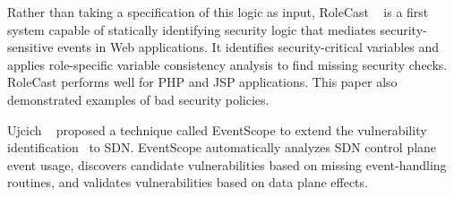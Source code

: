 Rather than taking a specification of this logic as input, RoleCast
\etal~\cite{10.1145/2048066.2048146} is a first system capable of statically
identifying security logic that mediates security-sensitive events in Web
applications. It identifies security-critical variables and applies
role-specific variable consistency analysis to find missing security checks.
RoleCast performs well for PHP and JSP applications. This paper also
demonstrated examples of bad security policies.

Ujcich \etal~\cite{Ujcich+etal:2020:EventScope} proposed a technique called
EventScope to extend the vulnerability identification~\cite{6994333} to SDN.
EventScope automatically analyzes SDN control plane event usage, discovers
candidate vulnerabilities based on missing event-handling routines, and
validates vulnerabilities based on data plane effects.

